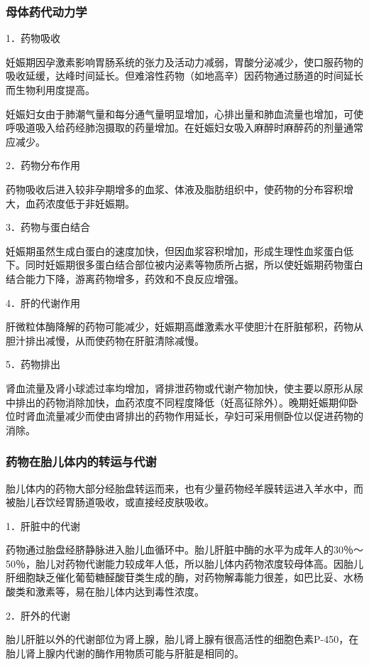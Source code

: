 \subsubsection{母体药代动力学}

1．药物吸收

妊娠期因孕激素影响胃肠系统的张力及活动力减弱，胃酸分泌减少，使口服药物的吸收延缓，达峰时间延长。但难溶性药物（如地高辛）因药物通过肠道的时间延长而生物利用度提高。

妊娠妇女由于肺潮气量和每分通气量明显增加，心排出量和肺血流量也增加，可使呼吸道吸入给药经肺泡摄取的药量增加。在妊娠妇女吸入麻醉时麻醉药的剂量通常应减少。

2．药物分布作用

药物吸收后进入较非孕期增多的血浆、体液及脂肪组织中，使药物的分布容积增大，血药浓度低于非妊娠期。

3．药物与蛋白结合

妊娠期虽然生成白蛋白的速度加快，但因血浆容积增加，形成生理性血浆蛋白低下。同时妊娠期很多蛋白结合部位被内泌素等物质所占据，所以使妊娠期药物蛋白结合能力下降，游离药物增多，药效和不良反应增强。

4．肝的代谢作用

肝微粒体酶降解的药物可能减少，妊娠期高雌激素水平使胆汁在肝脏郁积，药物从胆汁排出减慢，从而使药物在肝脏清除减慢。

5．药物排出

肾血流量及肾小球滤过率均增加，肾排泄药物或代谢产物加快，使主要以原形从尿中排出的药物消除加快，血药浓度不同程度降低（妊高征除外）。晚期妊娠期仰卧位时肾血流量减少而使由肾排出的药物作用延长，孕妇可采用侧卧位以促进药物的消除。

\subsubsection{药物在胎儿体内的转运与代谢}

胎儿体内的药物大部分经胎盘转运而来，也有少量药物经羊膜转运进入羊水中，而被胎儿吞饮经胃肠道吸收，或直接经皮肤吸收。

1．肝脏中的代谢

药物通过胎盘经脐静脉进入胎儿血循环中。胎儿肝脏中酶的水平为成年人的30％～50％，胎儿对药物代谢能力较成年人低，所以胎儿体内药物浓度较母体高。因胎儿肝细胞缺乏催化葡萄糖醛酸苷类生成的酶，对药物解毒能力很差，如巴比妥、水杨酸类和激素等，易在胎儿体内达到毒性浓度。

2．肝外的代谢

胎儿肝脏以外的代谢部位为肾上腺，胎儿肾上腺有很高活性的细胞色素P-450，在胎儿肾上腺内代谢的酶作用物质可能与肝脏是相同的。

